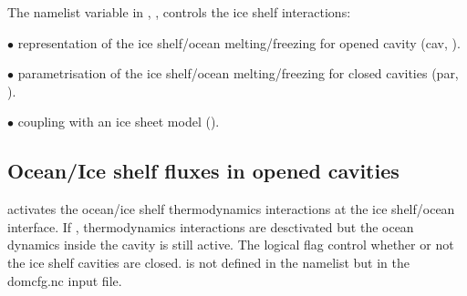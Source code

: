 \documentclass[../main/NEMO_manual]{subfiles}
\begin{document}
The namelist variable in , , controls the ice shelf interactions:
\begin{description}
   \item $\bullet$ representation of the ice shelf/ocean melting/freezing for opened cavity (cav, ).
   \item $\bullet$ parametrisation of the ice shelf/ocean melting/freezing for closed cavities (par, ).
   \item $\bullet$ coupling with an ice sheet model ().
\end{description}

  \subsection{Ocean/Ice shelf fluxes in opened cavities}

      activates the ocean/ice shelf thermodynamics interactions at the ice shelf/ocean interface. 
     If , thermodynamics interactions are desctivated but the ocean dynamics inside the cavity is still active.
     The logical flag  control whether or not the ice shelf cavities are closed.  is not defined in the namelist but in the domcfg.nc input file.\\
\end{document}

